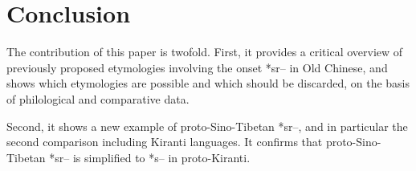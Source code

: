 \documentclass[oldfontcommands,oneside,a4paper,11pt]{article}
\newcommand{\ipa}[1]{{\phon #1}} %
\begin{document}
\section{Conclusion}

The contribution of this paper is twofold. First, it provides a critical overview of previously proposed etymologies involving the onset *\ipa{sr--} in Old Chinese, and shows which etymologies are possible and which should be discarded, on the basis of philological and comparative data.

Second, it shows a new example of proto-Sino-Tibetan *\ipa{sr--}, and in particular the second comparison including Kiranti languages. It confirms that proto-Sino-Tibetan *\ipa{sr--} is simplified to *\ipa{s--} in proto-Kiranti.




\end{document}
